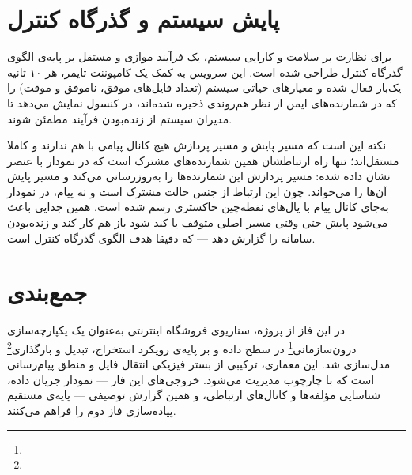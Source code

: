 \documentclass[a4paper,12pt]{article}
\begin{document}
\section{پایش سیستم و گذرگاه کنترل}
برای نظارت بر سلامت و کارایی سیستم، یک فرآیند موازی و مستقل بر پایه‌ی الگوی گذرگاه کنترل طراحی شده است. این سرویس به کمک یک کامپوننت تایمر، هر ۱۰ ثانیه یک‌بار فعال شده و معیارهای حیاتی سیستم (تعداد فایل‌های موفق، ناموفق و موقت) را که در شمارنده‌های ایمن از نظر هم‌روندی ذخیره شده‌اند، در کنسول نمایش می‌دهد تا مدیران سیستم از زنده‌بودن فرآیند مطمئن شوند.

نکته این است که مسیر پایش و مسیر پردازش هیچ کانال پیامی با هم ندارند و کاملا مستقل‌اند؛ تنها راه ارتباطشان همین شمارنده‌های مشترک است که در نمودار با عنصر  نشان داده شده: مسیر پردازش این شمارنده‌ها را به‌روزرسانی می‌کند و مسیر پایش آن‌ها را می‌خواند. چون این ارتباط از جنس حالت مشترک است و نه پیام، در نمودار به‌جای کانال پیام با یال‌های نقطه‌چین خاکستری رسم شده است. همین جدایی باعث می‌شود پایش حتی وقتی مسیر اصلی متوقف یا کند شود باز هم کار کند و زنده‌بودن سامانه را گزارش دهد — که دقیقا هدف الگوی گذرگاه کنترل است.

\section{جمع‌بندی}
در این فاز از پروژه، سناریوی فروشگاه اینترنتی به‌عنوان یک یکپارچه‌سازی درون‌سازمانی\footnote{} در سطح داده و بر پایه‌ی رویکرد استخراج، تبدیل و بارگذاری\footnote{} مدل‌سازی شد. این معماری، ترکیبی از بستر فیزیکی انتقال فایل و منطق پیام‌رسانی است که با چارچوب  مدیریت می‌شود. خروجی‌های این فاز — نمودار جریان داده، شناسایی مؤلفه‌ها و کانال‌های ارتباطی، و همین گزارش توصیفی — پایه‌ی مستقیم پیاده‌سازی فاز دوم را فراهم می‌کنند.
\end{document}
